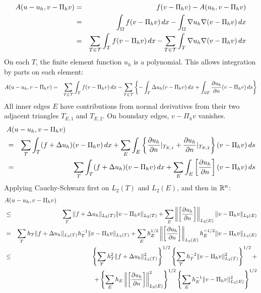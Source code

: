 \begin{eqnarray*}
A(u-u_h, v-\Pi_h v) & = & f(v-\Pi_h v) - A(u_h, v - \Pi_h v) \\
        & = & \int_{\Omega} f (v-\Pi_h v) \, dx - \int_\Omega \nabla u_h \nabla (v - \Pi_h v) \, dx \\
        & = & \sum_{T \in \cal T} \int_{T} f (v-\Pi_h v) \, dx - \sum_{T \in \cal T} \int_T \nabla u_h \nabla (v - \Pi_h v) \, dx
\end{eqnarray*}
On each $T$, the finite element function $u_h$ is a polynomial. This allows 
integration by  parts on each element:
\begin{eqnarray*}
A(u-u_h, v-\Pi_h v) 
        & = & \sum_{T \in \cal T} \int_{T} f (v-\Pi_h v) \, dx - \sum_{T \in \cal T} 
 \left\{ -\int_T \Delta u_h (v - \Pi_h v) \, dx + \int_{\partial T} \frac{\partial u_h}{\partial n} (v - \Pi_h v) \, ds \right\}
\end{eqnarray*}
All inner edges $E$ have contributions from normal derivatives from their two adjacent triangles $T_{E,1}$ and $T_{E,2}$. On boundary edges, $v-\Pi_h v$ vanishes.
\begin{eqnarray*}
\lefteqn{A(u-u_h, v-\Pi_h v)} \\
         & = & \sum_T \int_T (f + \Delta u_h) (v - \Pi_h v) \, dx
        + \sum_E \int_E \left\{
         \frac{\partial u_h}{\partial n}|_{T_{E,1}} +
         \frac{\partial u_h}{\partial n}|_{T_{E,2}}  \right\} (v - \Pi_h v) \, ds \\
& = & \sum_T \int_T (f + \Delta u_h) (v - \Pi_h v) \, dx
        + \sum_E \int_E \left[ \frac{\partial u_h}{\partial n} \right] (v - \Pi_h v) \, ds
\end{eqnarray*}
Applying Cauchy-Schwarz first on $L_2(T)$ and $L_2(E)$, and then in ${\mathbb R}^n$:
\begin{eqnarray*}
\lefteqn{A(u-u_h, v-\Pi_h v)} \\
        & \leq & \sum_T \| f + \Delta u_h \|_{L_2(T)} \| v - \Pi_h v \|_{L_2(T)}
        + \sum_E \left\| \left[ \frac{\partial u_h}{\partial n} \right] \right\|_{L_2(E)} \| v - \Pi_h v \|_{L_2(E)} \\
        & = & \sum_T h_T \| f + \Delta u_h \|_{L_2(T)} h_T^{-1} \| v - \Pi_h v \|_{L_2(T)}
        + \sum_E h_E^{1/2} \left\| \left[ \frac{\partial u_h}{\partial n} \right] \right\|_{L_2(E)} h_E^{-1/2} \| v - \Pi_h v \|_{L_2(E)} \\
        & \leq & 
        \left\{ \sum_T h_T^2 \| f + \Delta u_h \|_{L_2(T)}^2 \right\}^{1/2}  
        \left\{ \sum_T h_T^{-2} \| v - \Pi_h v \|_{L_2(T)}^2 \right\}^{1/2} + \\
        & & + 
        \left\{ \sum_E h_E \left\| \left[ \frac{\partial u_h}{\partial n} \right] \right\|_{L_2(E)}^2 \right\}^{1/2}  
        \left\{ \sum_E h_E^{-1} \| v - \Pi_h v \|_{L_2(E)}^2 \right\}^{1/2}
\end{eqnarray*}
